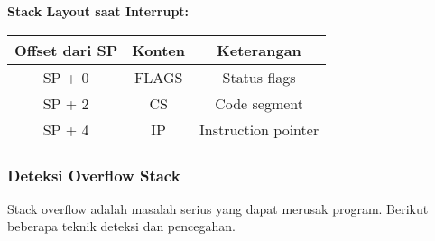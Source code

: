 \documentclass[../main.tex]{subfiles}
\begin{document}
                \textbf{Stack Layout saat Interrupt:}
                \begin{center}
                    \begin{tabular}{|c|c|c|}
                        \hline
                        \textbf{Offset dari SP} & \textbf{Konten} & \textbf{Keterangan} \\
                        \hline
                        SP + 0 & FLAGS & Status flags \\
                        \hline
                        SP + 2 & CS & Code segment \\
                        \hline
                        SP + 4 & IP & Instruction pointer \\
                        \hline
                    \end{tabular}
                \end{center}

            \subsubsection{Deteksi Overflow Stack}
                Stack overflow adalah masalah serius yang dapat merusak program. Berikut beberapa teknik deteksi dan pencegahan.
\end{document}
